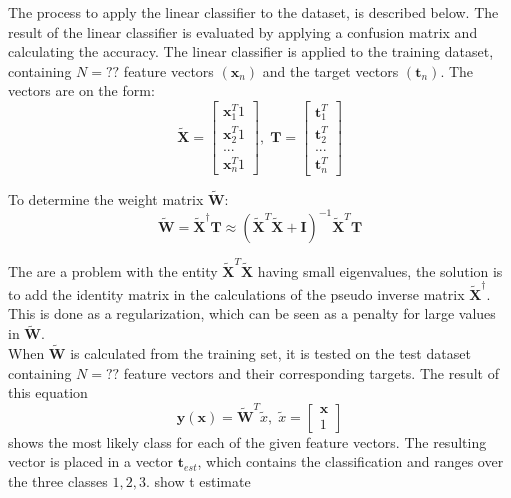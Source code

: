 The process to apply the linear classifier to the dataset, is described below. 
The result of the linear classifier is evaluated by applying a confusion matrix and calculating the accuracy. 
The linear classifier is applied to the training dataset, containing $N =??$ feature vectors $(\mathbf{x}_n)$ and the target vectors $(\mathbf{t}_n)$.
The vectors are on the form:
\begin{equation}
\mathbf{\tilde{X}}=\left[ \begin{array}{c}\mathbf{x}_1^T 1\\
\mathbf{x}_2^T 1\\
...\\ 
\mathbf{x}_n^T 1 \end{array} \right],
\;
\mathbf{T}=\left[ \begin{array}{c}
\mathbf{t}_1^T\\ 
\mathbf{t}_2^T\\ 
...\\
\mathbf{t}_n^T
\end{array} \right]
\label{eq:linearVectors}  
\end{equation} 

To determine the weight matrix $\tilde{\mathbf{W}}$:
\begin{equation}
\tilde{\mathbf{W}} = \tilde{\mathbf{X}}^\dagger \mathbf{T} \approx  (\tilde{\mathbf{X}}^T \tilde{\mathbf{X}}+\mathbf{I})^{-1} \tilde{\mathbf{X}}^T\mathbf{T}
\label{eq:weightVector}  
\end{equation}

The are a problem with the entity $\tilde{\mathbf{X}}^T \tilde{\mathbf{X}}$ having small eigenvalues, the solution is to add the identity matrix in the calculations of the pseudo inverse matrix $\tilde{\mathbf{X}}^\dagger$.
This is done as a regularization, which can be seen as a penalty for large values in $\tilde{\mathbf{W}}$.\\

When $\tilde{\mathbf{W}}$ is calculated from the training set, it is tested on the test dataset containing $N = ??$ feature vectors and their corresponding targets. 
The result of this equation
\begin{equation}
\mathbf{y}(\mathbf{x}) = \tilde{\mathbf{W}}^{T} \tilde{x},
\;
\tilde{x} = \left[\begin{array}{c}
\mathbf{x}\\ 1
\end{array} \right] 
\label{eq:Yclassifier}
\end{equation}
shows the most likely class for each of the given feature vectors. 
The resulting vector is placed in a vector $\mathbf{t}_{est}$, which contains the classification and ranges over the three classes ${1,2,3}$. show t estimate %

